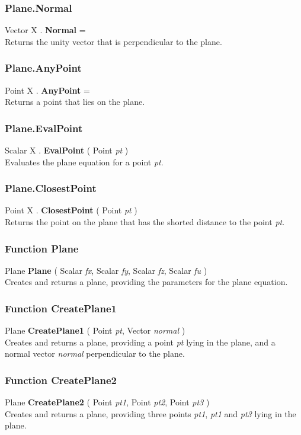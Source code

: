 \documentclass[10pt]{book}
\newcommand{\var}[1]{\textit{#1}}
\begin{document}
\subsubsection{Plane.Normal \label{F:Plane:Normal}}
Vector X . \textbf{Normal} = \\
Returns the unity vector that is perpendicular to the plane.

\subsubsection{Plane.AnyPoint \label{F:Plane:AnyPoint}}
Point X . \textbf{AnyPoint} = \\
Returns a point that lies on the plane.

\subsubsection{Plane.EvalPoint \label{F:Plane:EvalPoint}}
Scalar X . \textbf{EvalPoint} ( Point \textit{pt} ) \\
Evaluates the plane equation for a point \var{pt}.

\subsubsection{Plane.ClosestPoint \label{F:Plane:ClosestPoint}}
Point X . \textbf{ClosestPoint} ( Point \textit{pt} ) \\
Returns the point on the plane that has the shorted distance to the point \var{pt}.

\subsubsection{Function Plane \label{F:Plane}}
Plane \textbf{Plane} ( Scalar \textit{fx}, Scalar \textit{fy}, Scalar \textit{fz}, Scalar \textit{fu} ) \\
Creates and returns a plane, providing the parameters for the plane equation.

\subsubsection{Function CreatePlane1 \label{F:CreatePlane1}}
Plane \textbf{CreatePlane1} ( Point \textit{pt}, Vector \textit{normal} ) \\
Creates and returns a plane, providing a point \var{pt} lying in the plane, and a normal vector \var{normal} perpendicular to the plane.

\subsubsection{Function CreatePlane2 \label{F:CreatePlane2}}
Plane \textbf{CreatePlane2} ( Point \textit{pt1}, Point \textit{pt2}, Point \textit{pt3} ) \\
Creates and returns a plane, providing three points \var{pt1}, \var{pt1} and \var{pt3} lying in the plane.
\end{document}

